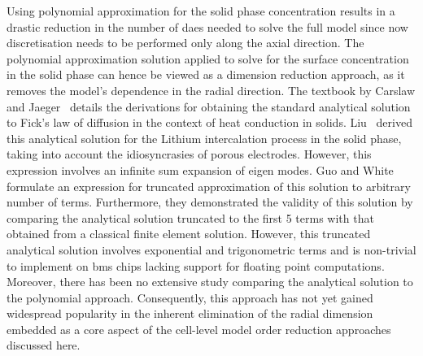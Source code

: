 Using polynomial  approximation for the  solid phase concentration results  in a
drastic reduction  in the number  of \gls{dae}s needed  to solve the  full model
since now discretisation  needs to be performed only along  the axial direction.
The  polynomial  approximation  solution  applied   to  solve  for  the  surface
concentration in  the solid phase can  hence be viewed as  a dimension reduction
approach, as  it removes  the model's  dependence in  the radial  direction. The
textbook by  Carslaw and  Jaeger~\cite{Carslaw1947} details the  derivations for
obtaining  the  standard analytical  solution  to  Fick's  law of  diffusion  in
the  context of  heat  conduction in  solids.  Liu~\cite{Liu2006a} derived  this
analytical solution  for the Lithium  intercalation process in the  solid phase,
taking into  account the idiosyncrasies of  porous electrodes.  However,  this  expression  involves  an
infinite sum expansion of eigen modes. Guo and White~\cite{Guo2012} formulate an
expression for truncated  approximation of this solution to  arbitrary number of
terms. Furthermore, they demonstrated the validity of this solution by comparing
the analytical solution truncated to the first 5 terms with that obtained from a
classical finite  element solution. However, this  truncated analytical solution
involves exponential and trigonometric terms  and is non-trivial to implement on
\gls{bms} chips lacking support for floating point computations. Moreover, there
has been no extensive study comparing  the analytical solution to the polynomial
approach. Consequently, this  approach has not yet  gained widespread popularity
in the inherent elimination of the radial dimension embedded as a core aspect of
the  cell-level model  order reduction  approaches discussed  here.


